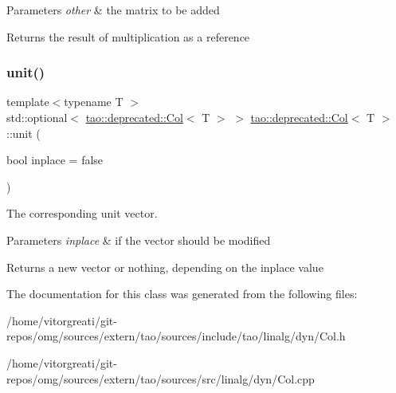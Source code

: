 \begin{DoxyParams}{Parameters}
{\em other} & the matrix to be added \\
\hline
\end{DoxyParams}
\begin{DoxyReturn}{Returns}
the result of multiplication as a reference 
\end{DoxyReturn}
\mbox{\label{classtao_1_1deprecated_1_1_col_ad2cee269711ef1a9eebda2e54035f9f4}} 
\subsubsection{\texorpdfstring{unit()}{unit()}}
{\footnotesize\ttfamily template$<$typename T $>$ \\
std\+::optional$<$ \mbox{\hyperlink{classtao_1_1deprecated_1_1_col}{tao\+::deprecated\+::\+Col}}$<$ T $>$ $>$ \mbox{\hyperlink{classtao_1_1deprecated_1_1_col}{tao\+::deprecated\+::\+Col}}$<$ T $>$\+::unit (\begin{DoxyParamCaption}\item[{bool}]{inplace = {\ttfamily false} }\end{DoxyParamCaption})}



The corresponding unit vector. 


\begin{DoxyParams}{Parameters}
{\em inplace} & if the vector should be modified \\
\hline
\end{DoxyParams}
\begin{DoxyReturn}{Returns}
a new vector or nothing, depending on the inplace value 
\end{DoxyReturn}


The documentation for this class was generated from the following files\+:\begin{DoxyCompactItemize}
\item 
/home/vitorgreati/git-\/repos/omg/sources/extern/tao/sources/include/tao/linalg/dyn/Col.\+h\item 
/home/vitorgreati/git-\/repos/omg/sources/extern/tao/sources/src/linalg/dyn/Col.\+cpp\end{DoxyCompactItemize}
